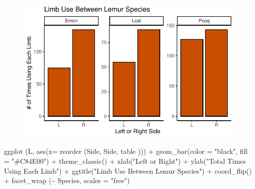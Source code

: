 \documentclass[
  letterpaper,
  DIV=11,
  numbers=noendperiod]{scrartcl}
\newenvironment{Shaded}{\begin{snugshade}}{\end{snugshade}}
\newcommand{\AttributeTok}[1]{\textcolor[rgb]{0.40,0.45,0.13}{#1}}
\newcommand{\FunctionTok}[1]{\textcolor[rgb]{0.28,0.35,0.67}{#1}}
\newcommand{\NormalTok}[1]{\textcolor[rgb]{0.00,0.23,0.31}{#1}}
\newcommand{\SpecialCharTok}[1]{\textcolor[rgb]{0.37,0.37,0.37}{#1}}
\newcommand{\StringTok}[1]{\textcolor[rgb]{0.13,0.47,0.30}{#1}}
\begin{document}
\begin{figure}[H]

{\centering \includegraphics{LeftyLemurs_files/figure-pdf/unnamed-chunk-17-1.pdf}

}

\end{figure}

\begin{Shaded}
\begin{Highlighting}[]
\FunctionTok{ggplot}\NormalTok{ (L, }\FunctionTok{aes}\NormalTok{(}\AttributeTok{x=} \FunctionTok{reorder}\NormalTok{ (Side, Side, table ))) }\SpecialCharTok{+}
  \FunctionTok{geom\_bar}\NormalTok{(}\AttributeTok{color =} \StringTok{"black"}\NormalTok{, }\AttributeTok{fill =} \StringTok{"\#C84E00"}\NormalTok{) }\SpecialCharTok{+}
  \FunctionTok{theme\_classic}\NormalTok{() }\SpecialCharTok{+}
  \FunctionTok{xlab}\NormalTok{(}\StringTok{"Left or Right"}\NormalTok{) }\SpecialCharTok{+}
  \FunctionTok{ylab}\NormalTok{(}\StringTok{"Total Times Using Each Limb"}\NormalTok{) }\SpecialCharTok{+}
  \FunctionTok{ggtitle}\NormalTok{(}\StringTok{"Limb Use Between Lemur Species"}\NormalTok{) }\SpecialCharTok{+}
  \FunctionTok{coord\_flip}\NormalTok{() }\SpecialCharTok{+}
  \FunctionTok{facet\_wrap}\NormalTok{ (}\SpecialCharTok{\textasciitilde{}}\NormalTok{ Species, }\AttributeTok{scales =} \StringTok{"free"}\NormalTok{)}
\end{Highlighting}
\end{Shaded}
\end{document}
